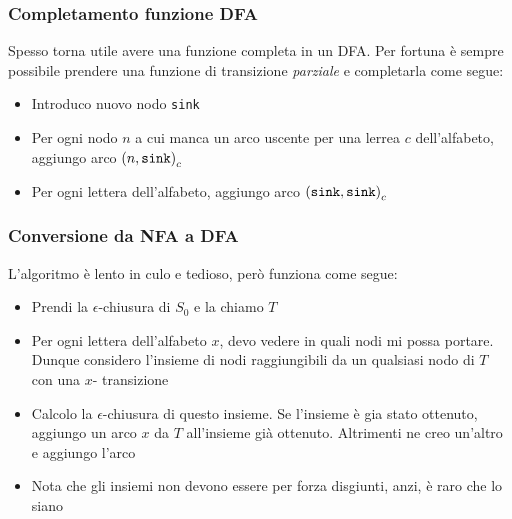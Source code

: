 \subsubsection{Completamento funzione DFA}\label{completamento funzione di transizione}
Spesso torna utile avere una funzione completa in un DFA. Per fortuna è sempre possibile prendere una funzione di transizione \textit{parziale} e completarla come segue:
\begin{itemize}
	\item Introduco nuovo nodo \verb|sink|
	\item Per ogni nodo $ n $ a cui manca un arco uscente per una lerrea $ c $ dell'alfabeto, aggiungo arco $ \left(n, \text{\ttfamily sink}\right)_{c} $
	\item Per ogni lettera dell'alfabeto, aggiungo arco $ \left(\text{\ttfamily sink}, \text{\ttfamily sink}\right)_c $
\end{itemize}

\subsubsection{Conversione da NFA a DFA}
L'algoritmo è lento in culo e tedioso, però funziona come segue:
\begin{itemize}
	\item Prendi la $\epsilon$-chiusura di $ S_0 $ e la chiamo $ T $
	\item Per ogni lettera dell'alfabeto $ x $, devo vedere in quali nodi mi possa portare. Dunque considero l'insieme di nodi raggiungibili da un qualsiasi nodo di $ T $ con una $ x $- transizione
	\item Calcolo la $ \epsilon $-chiusura di questo insieme. Se l'insieme è gia stato ottenuto, aggiungo un arco $ x $ da $ T $ all'insieme già ottenuto. Altrimenti ne creo un'altro e aggiungo l'arco
	\item Nota che gli insiemi non devono essere per forza disgiunti, anzi, è raro che lo siano
\end{itemize}
